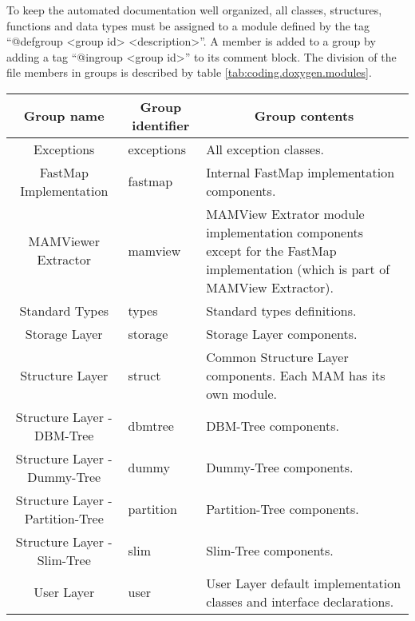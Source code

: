 To keep the automated documentation well organized, all classes, structures, functions and data types must be assigned to a module defined by the tag ``@defgroup <group id> <description>''. A member is added to a group by adding a tag ``@ingroup <group id>'' to its comment block. The division of the file members in groups is described by table \ref{tab:coding.doxygen.modules}.

\begin{table}[htb]
	\centering
	\begin{tabular}[t]{|c|l|l|}
		\hline
		\multicolumn{1}{|c|}{\bf Group name} &
		\multicolumn{1}{|c|}{\bf Group identifier} &
		\multicolumn{1}{|c|}{\bf Group contents} \\
		
		\hline
		Exceptions &
		exceptions &
		All exception classes.\\
		
		\hline
		FastMap Implementation &
		fastmap &
		Internal FastMap \cite{} implementation components.\\
		
		\hline
		MAMViewer Extractor &
		mamview &
		MAMView Extrator module implementation components except for the FastMap implementation (which is part of MAMView Extractor).\\

		\hline
		Standard Types &
		types &
		Standard types definitions. \\		
		
		\hline
		Storage Layer &
		storage &
		Storage Layer components.\\
		
		\hline
		Structure Layer &
		struct &
		Common Structure Layer components. Each MAM has its own module. \\		
		
		\hline
		Structure Layer - DBM-Tree &
		dbmtree &
		DBM-Tree components.\\		
		
		\hline
		Structure Layer - Dummy-Tree &
		dummy &
		Dummy-Tree components.\\		
		
		\hline
		Structure Layer - Partition-Tree &
		partition &
		Partition-Tree components.\\		
		
		\hline
		Structure Layer - Slim-Tree &
		slim &
		Slim-Tree \cite{} components. \\
		
		\hline
		User Layer &
		user &
		User Layer default implementation classes and interface declarations. \\ 
		

\end{tabular}
\end{table}

